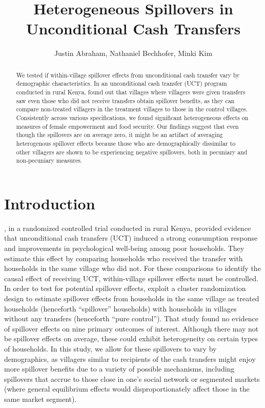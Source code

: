 \documentclass[11pt]{article}
\begin{document}
\title{Heterogeneous Spillovers in Unconditional Cash Transfers}

\author{
	Justin Abraham, Nathaniel Bechhofer, Minki Kim
}

\maketitle

	\begin{abstract}

	 We tested if within-village spillover effects from unconditional cash transfer vary by demographic characteristics. In an unconditional cash transfer (UCT) program conducted in rural Kenya, \textcite{haushofer_short-term_2016} found out that villages where villagers were given transfers saw even those who did not receive transfers obtain spillover benefits, as they can compare non-treated villagers in the treatment villages to those in the control villages. Consistently across various specifications, we found significant heterogeneous effects on measures of female empowerment and food security. Our findings suggest that even though the spillovers are on average zero, it might be an artifact of averaging heterogenous spillover effects because those who are demographically dissimilar to other villagers are shown to be experiencing negative spillovers, both in pecuniary and non-pecuniary measures.

 	\end{abstract}

\section{Introduction}

    \textcite{haushofer_short-term_2016}, in a randomized controlled trial conducted in rural Kenya, provided evidence that unconditional cash transfers (UCT) induced a strong consumption response and improvements in psychological well-being among poor households. They estimate this effect by comparing households who received the transfer with households in the same village who did not. For these comparisons to identify the causal effect of receiving UCT, within-village spillover effects must be controlled. 
    In order to test for potential spillover effects, \textcite{haushofer_short-term_2016} exploit a cluster randomization design to estimate spillover effects from households in the same village as treated households (henceforth ``spillover'' households) with households in villages without any transfers (henceforth ``pure control''). That study found no evidence of spillover effects on nine primary outcomes of interest. Although there may not be spillover effects on average, these could exhibit heterogeneity on certain types of households. In this study, we allow for these spillovers to vary by demographics, as villagers similar to recipients of the cash transfers might enjoy more spillover benefits due to a variety of possible mechanisms, including spillovers that accrue to those close in one's social network or segmented markets (where general equilibrium effects would disproportionately affect those in the same market segment). 
\end{document}
